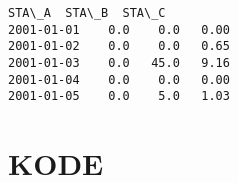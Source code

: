 \documentclass[11pt]{article}
\makeatletter
\newcommand{\boxspacing}{\kern\kvtcb@left@rule\kern\kvtcb@boxsep}
\newcommand{\prompt}[4]{
        {\ttfamily\llap{{\color{#2}[#3]:\hspace{3pt}#4}}\vspace{-\baselineskip}}
    }
\makeatother
\begin{document}
            \begin{tcolorbox}[breakable, size=fbox, boxrule=.5pt, pad at break*=1mm, opacityfill=0]
\prompt{Out}{outcolor}{ }{\boxspacing}
\begin{Verbatim}[commandchars=\\\{\}]
            STA\_A  STA\_B  STA\_C
2001-01-01    0.0    0.0   0.00
2001-01-02    0.0    0.0   0.65
2001-01-03    0.0   45.0   9.16
2001-01-04    0.0    0.0   0.00
2001-01-05    0.0    5.0   1.03
\end{Verbatim}
\end{tcolorbox}
        
    \hypertarget{kode}{%
\section{KODE}\label{kode}}
\end{document}
